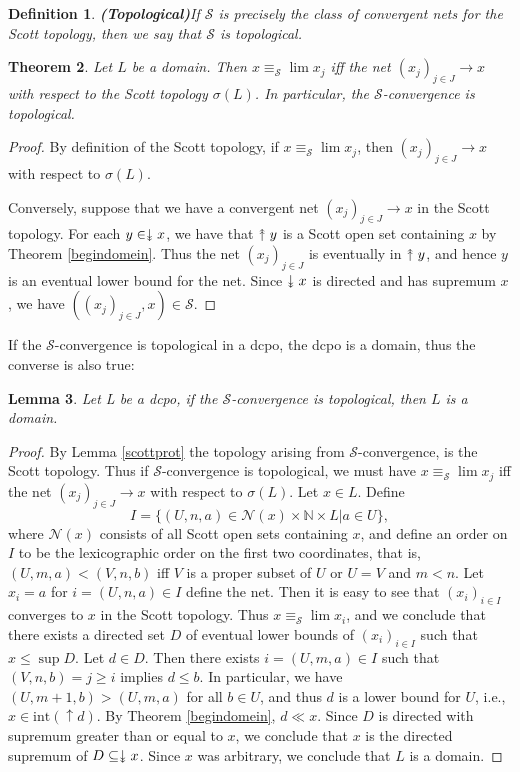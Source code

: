 \documentclass[a4paper,12pt]{article}
\newcommand{\upuparrow}{\mathrel{\reflectbox{\rotatebox[origin=c]{90}{$\twoheadrightarrow$}}}}
\newcommand{\downdownarrow}{\mathrel{\reflectbox{\rotatebox[origin=c]{90}{$\twoheadleftarrow$}}}}
\newtheorem{theorem}{Theorem}[section]
\newtheorem{lemma}[theorem]{Lemma}
\newtheorem{definition}[theorem]{Definition}
\newcommand{\N}{{\mathbb N}}
\renewcommand{\int}{\text{int}}
\begin{document}
\begin{definition}\textbf{(Topological)}If $\mathcal{S}$ is precisely the class of convergent nets for the Scott topology, then we say that $\mathcal{S}$ is \emph{topological}.
\end{definition}

\begin{theorem}
Let $L$ be a domain. Then $x \equiv_{\mathcal{S}} \lim x_j$ iff the net $(x_j)_{j\in J} \rightarrow x$ with respect to the Scott topology $\sigma(L)$. In particular, the $\mathcal{S}$-convergence is topological.
\end{theorem}
\begin{proof}
By definition of the Scott topology, if $x \equiv_{\mathcal{S}} \lim x_j$, then $(x_j)_{j\in J} \rightarrow x$ with respect to $\sigma(L)$.

Conversely, suppose that we have a convergent net $(x_j)_{j\in J} \rightarrow x$ in the Scott topology. For each $y \in \downdownarrow x$, we have that $\upuparrow y$ is a Scott open set containing $x$ by Theorem \ref{begindomein}. Thus the net $(x_j)_{j\in J}$ is eventually in $\upuparrow y$, and hence $y$ is an eventual lower bound for the net. Since $\downdownarrow x$ is directed and has supremum $x$, we have $((x_j)_{j\in J}, x) \in \mathcal{S}$.
\end{proof}
If the $\mathcal{S}$-convergence is topological in a dcpo, the dcpo is a domain, thus the converse is also true:
\begin{lemma}
Let L be a dcpo, if the $\mathcal{S}$-convergence is topological, then $L$ is a domain.
\end{lemma}

\begin{proof}
By Lemma \ref{scottprot} the topology arising from $\mathcal{S}$-convergence, is the Scott topology. Thus if $\mathcal{S}$-convergence is topological, we must have $x \equiv_{\mathcal{S}} \lim x_j$ iff the net $(x_j)_{j\in J} \rightarrow x$ with respect to $\sigma(L)$. Let $x \in L$. Define $$I = \{(U,n,a) \in \mathcal{N}(x) \times \N \times L | a \in U\},$$
where $\mathcal{N}(x)$ consists of all Scott open sets containing $x$, and define an order on $I$ to be the lexicographic order on the first two coordinates, that is, $(U, m, a) < (V, n, b)$ iff $V$ is a proper subset of $U$ or $U = V$ and $m < n$. Let $x_i = a$ for $i = (U, n, a) \in I$ define the net. Then it is easy to see that $(x_i)_{i \in I}$ converges to $x$ in the Scott topology. Thus $x \equiv_\mathcal{S} \lim x_i$, and we conclude that there exists a directed set $D$ of eventual lower bounds of $(x_i)_{i\in I}$ such that $x \leq \sup D$. Let $d \in D$. Then there exists $i = (U, m, a) \in I$ such that $(V, n, b) = j \geq i$ implies $d \leq b$. In particular, we have $(U, m + 1, b) > (U, m, a)$ for all $b \in U$, and thus $d$ is a lower bound for $U$, i.e., $x \in \int(\uparrow d)$. By Theorem \ref{begindomein}, $d \ll x$. Since $D$ is directed with supremum greater than or equal to $x$, we conclude that $x$ is the directed supremum of $D \subseteq \downdownarrow x$. Since $x$ was arbitrary, we conclude that $L$ is a domain.
\end{proof}
\end{document}
